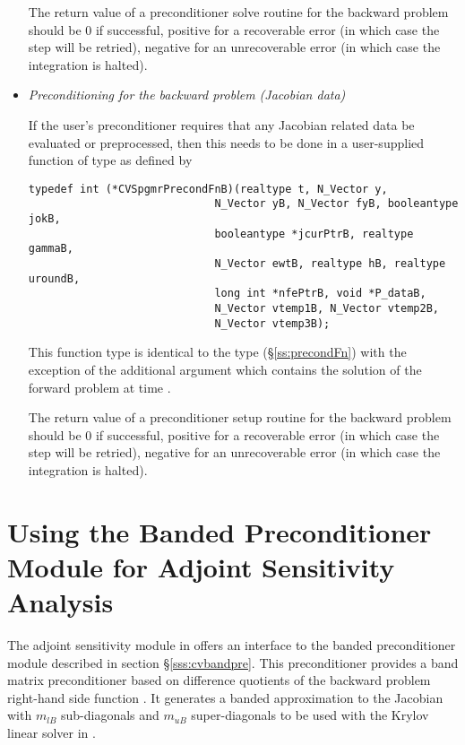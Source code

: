 \begin{itemize}
  The return value of a preconditioner solve routine for the backward
  problem should be $0$ if successful, 
  positive for a recoverable error (in which case the step will be retried),     
  negative for an unrecoverable error (in which case the integration is halted).

\item {\em Preconditioning for the backward problem
    (Jacobian data)}

  If the user's preconditioner requires that any Jacobian related data
  be evaluated or preprocessed, then this needs to be done in a
  user-supplied {\C} function of type  
  as defined by
\begin{verbatim}
typedef int (*CVSpgmrPrecondFnB)(realtype t, N_Vector y, 
                             N_Vector yB, N_Vector fyB, booleantype jokB, 
                             booleantype *jcurPtrB, realtype gammaB,
                             N_Vector ewtB, realtype hB, realtype uroundB,
                             long int *nfePtrB, void *P_dataB,
                             N_Vector vtemp1B, N_Vector vtemp2B,
                             N_Vector vtemp3B);
\end{verbatim}
  This function type is identical to the type 
  (\S\ref{ss:precondFn}) with the exception
  of the additional argument  which contains the solution of the 
  forward problem at time .

  The return value of a preconditioner setup routine for the backward
  problem should be $0$ if successful, 
  positive for a recoverable error (in which case the step will be retried),     
  negative for an unrecoverable error (in which case the integration is halted).

\end{itemize}

\section{Using the Banded Preconditioner Module for Adjoint Sensitivity Analysis}

The adjoint sensitivity module in {\cvodes} offers an interface to the banded 
preconditioner module {\cvbandpre} described in section \S\ref{sss:cvbandpre}.
This preconditioner provides a band matrix preconditioner based on difference
quotients of the backward problem right-hand side function . It generates
a banded approximation to the Jacobian with $m_{lB}$ sub-diagonals and $m_{uB}$
super-diagonals to be used with the Krylov linear solver in {\cvspgmr}.

